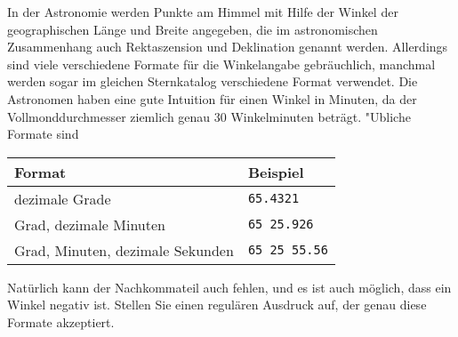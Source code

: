 In der Astronomie werden Punkte am Himmel mit Hilfe der Winkel
der geographischen Länge und Breite angegeben, die im astronomischen
Zusammenhang auch
Rektaszension und Deklination genannt werden.
Allerdings sind viele verschiedene Formate für die
Winkelangabe gebräuchlich, manchmal werden sogar im gleichen Sternkatalog
verschiedene Format verwendet.
Die Astronomen haben eine gute Intuition für einen Winkel in Minuten,
da der Vollmonddurchmesser ziemlich genau 30 Winkelminuten beträgt.
"Ubliche Formate sind
\begin{center}
\begin{tabular}{ll}
Format&Beispiel\\
\hline
dezimale Grade&\texttt{65.4321}\\
Grad, dezimale Minuten&\texttt{65 25.926}\\
Grad, Minuten, dezimale Sekunden&\texttt{65 25 55.56}\\
\hline
\end{tabular}
\end{center}
Natürlich kann der Nachkommateil auch fehlen, und es ist auch möglich, dass
ein Winkel negativ ist.
Stellen Sie einen regulären Ausdruck auf, der genau diese Formate
akzeptiert. 


